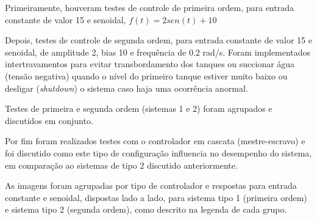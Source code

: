 %
%
Primeiramente, houveram testes de controle de primeira ordem, para entrada constante de valor 15 e senoidal,
$f(t)= 2sen(t)+10$

Depois, testes de controle de segunda ordem, para entrada constante de valor 15 e senoidal, de amplitude 2, bias 10 e frequência de 0.2 rad/s. Foram implementados intertravamentos para evitar transbordamento dos tanques ou succionar água (tensão negativa) quando o nível do primeiro tanque estiver muito baixo ou desligar (\emph{shutdown}) o sistema caso haja uma ocorrência anormal.

Testes de primeira e segunda ordem (sistemas 1 e 2) foram agrupados e discutidos em conjunto.

Por fim foram realizados testes com o controlador em cascata (mestre-escravo) e foi discutido como este tipo de configuração influencia no desempenho do sistema, em comparação ao sistemas de tipo 2 discutido anteriormente.

As imagens foram agrupadas por tipo de controlador e respostas para entrada constante e senoidal, dispostas lado a lado, para sistema tipo 1 (primeira ordem) e sistema tipo 2 (segunda ordem), como descrito na legenda de cada grupo.
%
%
% 
% 
% 

% 
% 
% 
% 

% 
% 
\newpage
%
% 

\newpage
%
% 

\newpage
%
% 

\newpage
%
% 
